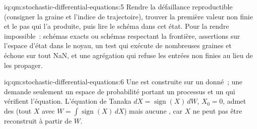 \begin{solution}{iq:qm:stochastic-differential-equations:5}
Rendre la défaillance reproductible (consigner la graine et l'indice de trajectoire), trouver la première valeur non finie
et le pas qui l'a produite, puis lire le schéma dans cet état. Pour la rendre impossible~: schémas exacts ou
schémas respectant la frontière, assertions sur l'espace d'état dans le noyau, un test qui exécute de nombreuses
graines et échoue sur tout NaN, et une agrégation qui refuse les entrées non finies au lieu de
les propager.
\end{solution}

\begin{solution}{iq:qm:stochastic-differential-equations:6}
Une  est construite sur un  donné~; une  demande seulement un espace de probabilité
portant un processus et un  qui vérifient l'équation. L'équation de Tanaka $dX =
\operatorname{sign}(X)\,dW$, $X_0 = 0$, admet des  (tout  $X$ avec $W = \int\operatorname{sign}(X)\,dX$)
mais aucune , car $X$ ne peut pas être reconstruit à partir de $W$.
\end{solution}
